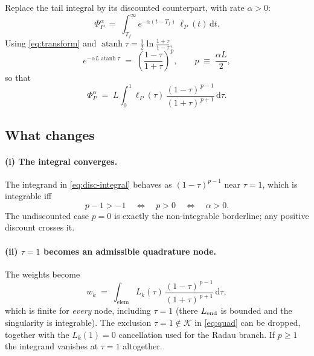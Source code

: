 \documentclass[11pt]{article}
\begin{document}
Replace the tail integral by its discounted counterpart, with rate
$\alpha>0$:
%
\begin{equation}
  \Phi_P^{\alpha}
  \;=\;\int_{T_f}^{\infty} e^{-\alpha (t-T_f)}\,\ell_P(t)\,\mathrm{d}t .
\end{equation}
%
Using \eqref{eq:transform} and
$\operatorname{atanh}\tau=\tfrac12\ln\frac{1+\tau}{1-\tau}$,
%
\begin{equation}
  e^{-\alpha L \operatorname{atanh}\tau}
  \;=\;\left(\frac{1-\tau}{1+\tau}\right)^{p},
  \qquad p \;\equiv\; \frac{\alpha L}{2},
\end{equation}
%
so that
%
\begin{equation}
  \Phi_P^{\alpha}
  \;=\; L\int_0^1 \ell_P(\tau)\,
        \frac{(1-\tau)^{\,p-1}}{(1+\tau)^{\,p+1}}\,\mathrm{d}\tau .
  \label{eq:disc-integral}
\end{equation}

\subsection{What changes}

\paragraph{(i) The integral converges.}
The integrand in \eqref{eq:disc-integral} behaves as $(1-\tau)^{p-1}$ near
$\tau=1$, which is integrable iff
%
\begin{equation}
  p-1 > -1
  \quad\Longleftrightarrow\quad
  p>0
  \quad\Longleftrightarrow\quad
  \alpha>0 .
\end{equation}
%
The undiscounted case $p=0$ is exactly the non-integrable borderline; any
positive discount crosses it.

\paragraph{(ii) $\tau=1$ becomes an admissible quadrature node.}
The weights become
%
\begin{equation}
  w_k \;=\; \int_{\mathrm{elem}} L_k(\tau)\,
            \frac{(1-\tau)^{\,p-1}}{(1+\tau)^{\,p+1}}\,\mathrm{d}\tau ,
  \label{eq:disc-weights}
\end{equation}
%
which is finite for \emph{every} node, including $\tau=1$ (there $L_{\rm
end}$ is bounded and the singularity is integrable). The exclusion
$\tau=1\notin\mathcal{K}$ in \eqref{eq:quad} can be dropped, together with the
$L_k(1)=0$ cancellation used for the Radau branch. If $p\ge 1$ the integrand
vanishes at $\tau=1$ altogether.
\end{document}
